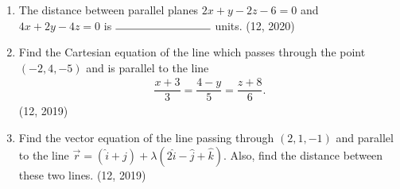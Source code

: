 \begin{enumerate}[label=\thesubsection.\arabic*, ref=\thesubsection.\theenumi]
\item The distance between parallel planes $2x + y - 2z - 6 = 0$ and $4x + 2y - 4z = 0$ is $\rule{3cm}{0.15mm}$ units.
\hfill (12, 2020)
	\item Find the Cartesian equation of the line which passes through the point $(-2, 4, -5)$ and is parallel to the line
	\begin{align*}
	\dfrac{x+3}{3} = \dfrac{4-y}{5} = \dfrac{z+8}{6}.
	\end{align*} \hfill (12, 2019)
	\item Find the vector equation of the line passing through $(2, 1, -1)$ and parallel to the line $\overrightarrow{r} = (\hat{i} + \hat{j}) + \lambda (2\hat{i} - \hat{j} + \hat{k})$. Also, find the distance between these two lines. \hfill (12, 2019)
\end{enumerate}
